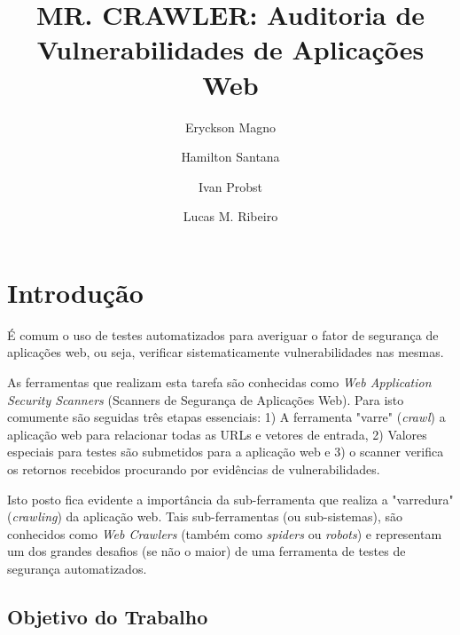 \documentclass[twocolumn,showpacs,%
  nofootinbib,aps,superscriptaddress,%
  eqsecnum,prd,notitlepage,showkeys,10pt]{revtex4-1}
\begin{document}
\def\acknowledgmentsname{Agradecimentos}
\def\andname{e}
\def\indexname{Indíce}
\def\figuresname{Figuras}%
\def\tablename{TABELA}
\def\tablesname{Tabelas}%

\title{MR. CRAWLER: Auditoria de Vulnerabilidades de Aplicações Web}
\author{Eryckson Magno}
\author{Hamilton Santana}
\author{Ivan Probst}
\author{Lucas M. Ribeiro}


\maketitle

\section{Introdução}
\label{sec:introducao}

É comum o uso de testes automatizados para averiguar o fator de segurança de aplicações web, ou seja, verificar sistematicamente vulnerabilidades nas mesmas.

As ferramentas que realizam esta tarefa são conhecidas como \emph{Web Application Security Scanners} (Scanners de Segurança de Aplicações Web). Para isto comumente são seguidas três etapas essenciais: 1) A ferramenta "varre" (\emph{crawl}) a aplicação web para relacionar todas as URLs e vetores de entrada, 2) Valores especiais para testes são submetidos para a aplicação web e 3) o scanner verifica os retornos recebidos procurando por evidências de vulnerabilidades.

Isto posto fica evidente a importância da sub-ferramenta que realiza a "varredura" (\emph{crawling}) da aplicação web. Tais sub-ferramentas (ou sub-sistemas), são conhecidos como \emph{Web Crawlers} (também como \emph{spiders} ou \emph{robots}) e representam um dos grandes desafios (se não o maior) de uma ferramenta de testes de segurança automatizados.

\subsection{Objetivo do Trabalho}
\end{document}
